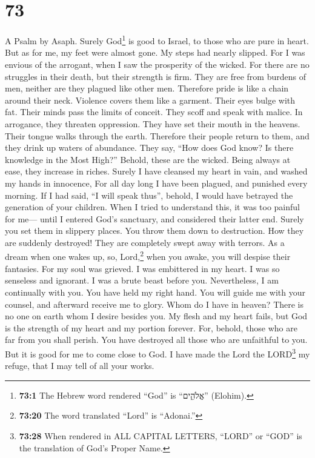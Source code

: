 \hypertarget{section-71}{%
\section{73}\label{section-71}}

A Psalm by Asaph.  Surely God\footnote{\textbf{73:1} The
  Hebrew word rendered ``God'' is ``אֱלֹהִ֑ים'' (Elohim).} is good to
Israel, to those who are pure in heart.  But as for me, my
feet were almost gone. My steps had nearly slipped.  For I
was envious of the arrogant, when I saw the prosperity of the wicked.
 For there are no struggles in their death, but their
strength is firm.  They are free from burdens of men,
neither are they plagued like other men.  Therefore pride
is like a chain around their neck. Violence covers them like a garment.
 Their eyes bulge with fat. Their minds pass the limits of
conceit.  They scoff and speak with malice. In arrogance,
they threaten oppression.  They have set their mouth in
the heavens. Their tongue walks through the earth. 
Therefore their people return to them, and they drink up waters of
abundance.  They say, ``How does God know? Is there
knowledge in the Most High?''  Behold, these are the
wicked. Being always at ease, they increase in riches. 
Surely I have cleansed my heart in vain, and washed my hands in
innocence,  For all day long I have been plagued, and
punished every morning.  If I had said, ``I will speak
thus'', behold, I would have betrayed the generation of your children.
 When I tried to understand this, it was too painful for
me---  until I entered God's sanctuary, and considered
their latter end.  Surely you set them in slippery
places. You throw them down to destruction.  How they are
suddenly destroyed! They are completely swept away with terrors.
 As a dream when one wakes up, so, Lord,\footnote{\textbf{73:20}
  The word translated ``Lord'' is ``Adonai.''} when you awake, you will
despise their fantasies.  For my soul was grieved. I was
embittered in my heart.  I was so senseless and ignorant.
I was a brute beast before you.  Nevertheless, I am
continually with you. You have held my right hand.  You
will guide me with your counsel, and afterward receive me to glory.
 Whom do I have in heaven? There is no one on earth whom
I desire besides you.  My flesh and my heart fails, but
God is the strength of my heart and my portion forever. 
For, behold, those who are far from you shall perish. You have destroyed
all those who are unfaithful to you.  But it is good for
me to come close to God. I have made the Lord the LORD\footnote{\textbf{73:28}
  When rendered in ALL CAPITAL LETTERS, ``LORD'' or ``GOD'' is the
  translation of God's Proper Name.} my refuge, that I may tell of all
your works.

